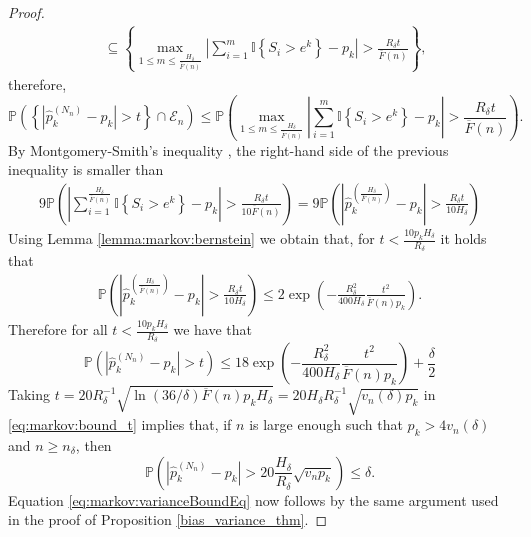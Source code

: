 \documentclass[sn-mathphys-ay]{sn-jnl}%
\newcommand{\I}{\mathbb{I}}
\renewcommand{\P}{\mathbb{P}}
\begin{document}
\begin{appendices}
\begin{proof}
\begin{align*}
                                                                      & \subseteq \left\{ \max_{1\leq m\leq \frac{H_\delta}{\overline{F}(n)}} \left| \sum_{i=1}^{m}{\I\left\{ S_i>e^k \right\}} - p_k \right| > \frac{R_\delta t}{\overline{F}(n)} \right\},\label{eq:markov:inclussions}
    \end{align*}
    therefore,
    \begin{equation*}
        \P\left(\left\{\left| \widehat{p}^{(N_n)}_k - p_k \right|>t\right\}\cap \mathcal{E}_n\right) \leqslant \P \left( \max_{1\leq m\leq \frac{H_\delta}{\overline{F}(n)}} \left| \sum_{i=1}^{m}{\I\left\{ S_i>e^k \right\}} - p_k \right| > \frac{R_\delta t}{\overline{F}(n)} \right).
    \end{equation*}
    By Montgomery-Smith's inequality \cite[Corollary 4]{montgomery1993comparison}, the right-hand side of the previous
    inequality is smaller than
    \begin{align*}
        9\P\left( \left| \sum_{i=1}^{\frac{H_{\delta}}{\overline{F}(n)}}{\I\left\{ S_i>e^k \right\}} - p_k \right| > \frac{R_\delta t}{10\overline{F}(n)} \right) = 9\P\left( \left| \widehat{p}^{ \left(\frac{H_{\delta}}{\overline{F}(n)}\right) }_k-p_k \right| > \frac{R_{\delta}t}{10H_{\delta}} \right)
    \end{align*}
    Using Lemma \ref{lemma:markov:bernstein} we obtain that, for \(t<\frac{10p_k H_\delta }{R_\delta}\) it holds that
    \begin{align*}
        \P\left( \left| \widehat{p}^{\left(\frac{H_{\delta}}{\overline{F}(n)}\right)}_k-p_k \right| > \frac{R_{\delta}t}{10H_{\delta}} \right) \leq 2 \exp\left(-\frac{R^2_{\delta}}{400H_{\delta}}\frac{t^2}{\overline{F}(n)p_k}\right).
    \end{align*}
    Therefore for all \(t<\frac{10p_k H_\delta }{R_\delta}\) we have that
    \begin{equation}\label{eq:markov:bound_t}
        \P\left( \left| \widehat{p}^{(N_n)}_k - p_k \right|>t \right)\leq 18\exp\left(-\frac{R^2_{\delta}}{400H_{\delta}}\frac{t^2}{\overline{F}(n)p_k}\right)+\frac{\delta}{2}
    \end{equation}
    Taking \(t=20R^{-1}_{\delta}\sqrt{\ln{(36/\delta)} \overline{F}(n)p_k H_\delta }=20 H_\delta R^{-1}_\delta\sqrt{v_n(\delta)p_k}\) in \eqref{eq:markov:bound_t}
    implies that, if \(n\) is large enough such that \(p_k>4v_n(\delta)\)
    and \(n\geq n_\delta\), then
    \begin{equation}\label{eq:markov:bound_t}
        \P\left( \left| \widehat{p}^{(N_n)}_k - p_k \right|> 20\frac{H_\delta}{R_\delta}\sqrt{v_n p_k} \right)\leq \delta.
    \end{equation}
    Equation \eqref{eq:markov:varianceBoundEq} now follows by the same argument used in the proof
    of Proposition \ref{bias_variance_thm}.
\end{proof}


\end{appendices}
\end{document}
